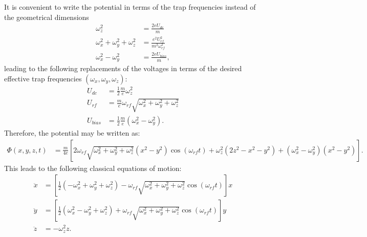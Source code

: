 \documentclass[a4paper,10pt]{article}
\begin{document}
It is convenient to write the potential in terms of the trap frequencies instead of the geometrical dimensions
\begin{align}
\omega_z^2&=\frac{2eU_{dc}}{m}\\
\omega_x^2+\omega_y^2+\omega_z^2&=\frac{e^2U_{rf}^2}{m^2\omega_{rf}^2}\\
\omega_x^2-\omega_y^2&=\frac{2eU_{bias}}{m},
\end{align}
leading to the following replacements of the voltages in terms of the desired effective trap frequencies $(\omega_x, \omega_y, \omega_z)$:
\begin{align}
U_{dc}&=\frac{1}{2}\frac{m}{e}\omega_z^2\\
U_{rf}&=\frac{m}{e}\omega_{rf}\sqrt{\omega_x^2+\omega_y^2+\omega_z^2}\\
U_{bias}&=\frac{1}{2}\frac{m}{e}(\omega_x^2-\omega_y^2).
\end{align}
Therefore, the potential may be written as:
\begin{align}
 \Phi(x,y,z,t) &= \frac{m}{4e} \left[2 \omega_{rf} \sqrt{\omega_x^2 + \omega_y^2 + \omega_z^2} \left( x^2 - y^2 \right) \cos (\omega_{rf} t)
+\omega_z^2 (2z^2 - x^2 - y^2) + \left( \omega_x^2 - \omega_y^2 \right) (x^2 - y^2) \right].
\end{align}
This leads to the following classical equations of motion:
\begin{align}
\ddot{x}&=\left[\frac{1}{2}(-\omega_x^2+\omega_y^2+\omega_z^2)-\omega_{rf}\sqrt{\omega_x^2+\omega_y^2+\omega_z^2}\cos(\omega_{rf}t)\right]x\\
\ddot{y}&=\left[\frac{1}{2}(\omega_x^2-\omega_y^2+\omega_z^2)+\omega_{rf}\sqrt{\omega_x^2+\omega_y^2+\omega_z^2}\cos(\omega_{rf}t)\right]y\\
\ddot{z}&=-\omega_z^2z.
\end{align}
\end{document}
